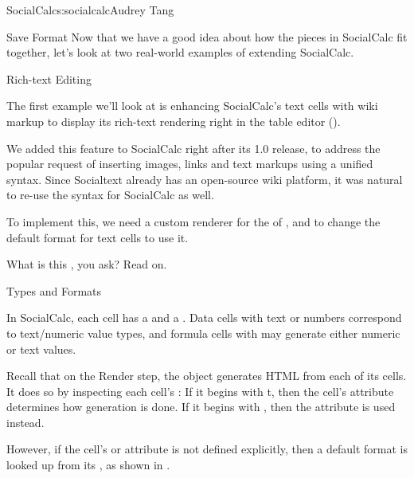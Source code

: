 \begin{aosachapter}{SocialCalc}{s:socialcalc}{Audrey Tang}
\begin{aosasect1}{Save Format}
Now that we have a good idea about how the pieces in SocialCalc fit
together, let's look at two real-world examples of extending
SocialCalc.

\end{aosasect1}

\begin{aosasect1}{Rich-text Editing}

The first example we'll look at is enhancing SocialCalc's text cells
with wiki markup to display its rich-text rendering right in the
table editor ().


We added this feature to SocialCalc right after its 1.0 release, to
address the popular request of inserting images, links and text
markups using a unified syntax.  Since Socialtext already has an
open-source wiki platform, it was natural to re-use the syntax for
SocialCalc as well.

To implement this, we need a custom renderer for the
 of , and to change the default
format for text cells to use it.

What is this , you ask?  Read on.

\begin{aosasect2}{Types and Formats}

In SocialCalc, each cell has a  and a .
Data cells with text or numbers correspond to text/numeric value
types, and formula cells with  may generate either
numeric or text values.

Recall that on the Render step, the  object generates HTML
from each of its cells.  It does so by inspecting each cell's
: If it begins with t, then the cell's
 attribute determines how generation is done.
If it begins with , then the  attribute is
used instead.

However, if the cell's  or
 attribute is not defined explicitly, then a
default format is looked up from its , as shown in
.




\end{aosasect2}
\end{aosasect1}
\end{aosachapter}
